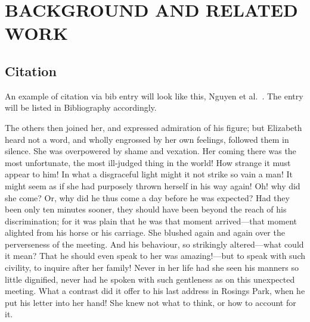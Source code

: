 \chapter{BACKGROUND AND RELATED WORK}
\label{ch:background}

\section{Citation}

An example of citation via bib entry will look like this, Nguyen et al.~\cite{Nguyen2022MalView}. The entry will be listed in Bibliography accordingly.

The others then joined her, and expressed admiration of his figure; but Elizabeth heard not a word, and wholly engrossed by her own feelings, followed them in silence. She was overpowered by shame and vexation. Her coming there was the most unfortunate, the most ill-judged thing in the world! How strange it must appear to him! In what a disgraceful light might it not strike so vain a man! It might seem as if she had purposely thrown herself in his way again! Oh! why did she come? Or, why did he thus come a day before he was expected? Had they been only ten minutes sooner, they should have been beyond the reach of his discrimination; for it was plain that he was that moment arrived—that moment alighted from his horse or his carriage. She blushed again and again over the perverseness of the meeting. And his behaviour, so strikingly altered—what could it mean? That he should even speak to her was amazing!—but to speak with such civility, to inquire after her family! Never in her life had she seen his manners so little dignified, never had he spoken with such gentleness as on this unexpected meeting. What a contrast did it offer to his last address in Rosings Park, when he put his letter into her hand! She knew not what to think, or how to account for it.
